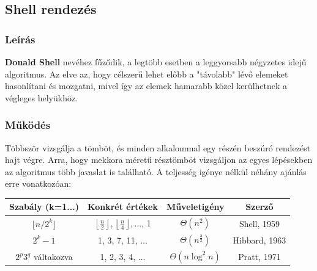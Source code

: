 \documentclass{elteikthesis}
\begin{document}
\subsection{Shell rendezés}
\subsubsection{Leírás}
\textbf{Donald Shell} nevéhez fűződik, a legtöbb esetben a leggyorsabb négyzetes idejű algoritmus. Az elve az, hogy célszerű lehet előbb a "távolabb" lévő elemeket hasonlítani és mozgatni, mivel így az elemek hamarabb közel kerülhetnek a végleges helyükhöz.
\subsubsection{Működés}
Többször vizsgálja a tömböt, és minden alkalommal egy részén beszúró rendezést hajt végre. Arra, hogy mekkora méretű résztömböt vizsgáljon az egyes lépésekben az algoritmus több javaslat is található. A teljesség igénye nélkül néhány ajánlás\cite{ShellWiki} erre vonatkozóan:\par
\begin{table}[h]
	\def\arraystretch{2}
	\centering
	\begin{tabular}{|c|c|c|c|}
		\hline
		\textbf{Szabály (k=1...)} & \textbf{Konkrét értékek}  & \textbf{Műveletigény} & \textbf{Szerző}         \\ \hline
		$\lfloor n / 2^k \rfloor$&      $\left\lfloor\frac{n}{2}\right\rfloor,
		\left\lfloor\frac{n}{4}\right\rfloor, \ldots$, 1            &              $\Theta(n^2)$                      & Shell, 1959     \\ \hline
		$2^k-1$&      1, 3, 7, 11, $\ldots$           &              $\Theta(n^\frac{3}{2})$                      & Hibbard, 1963    \\ \hline
		$2^p 3^q$ váltakozva & 1, 2, 3, 4, $\ldots$  &               $\Theta(n \log^2 n)$                     & Pratt, 1971     \\ \hline
	\end{tabular}
\end{table}
\end{document}
